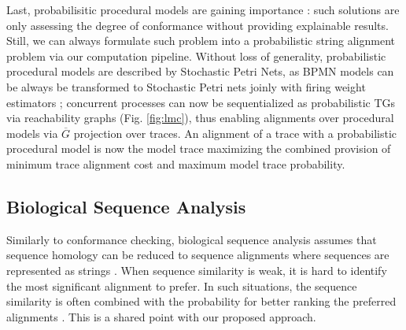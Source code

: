  
Last, probabilisitic procedural models are gaining importance \cite{DBLP:conf/bpm/LeemansSA19,DBLP:conf/icpm/PolyvyanyyK19,DBLP:journals/tosem/PolyvyanyySWCM20}: such solutions are only assessing the degree of conformance without providing explainable results. Still, we can always formulate such problem into a probabilistic string alignment problem via our computation pipeline.
Without loss of generality, probabilistic procedural models are described by Stochastic Petri Nets, as BPMN models can be always be transformed to Stochastic Petri nets \cite{RaedtsPUWGS07} joinly with firing weight estimators \cite{spdwe}; concurrent processes can now be sequentialized as probabilistic TGs via reachability graphs (Fig. \ref{fig:lmc}), thus enabling  alignments over procedural models via $\overline{G}$ projection over traces. An alignment of a trace with a probabilistic procedural model is now the model trace maximizing the combined provision of minimum trace alignment cost and maximum model trace probability. 
 








\subsection{Biological Sequence Analysis}
Similarly to conformance checking, biological sequence analysis assumes that sequence homology can be reduced to sequence alignments where sequences are represented as strings \cite{durbin1998biological}. When sequence similarity is weak, it is hard to identify the most significant alignment to prefer. In such situations, the sequence similarity is often combined with the probability for better ranking the preferred alignments \cite{durbin1998biological}. This is a shared point with our proposed approach. 

